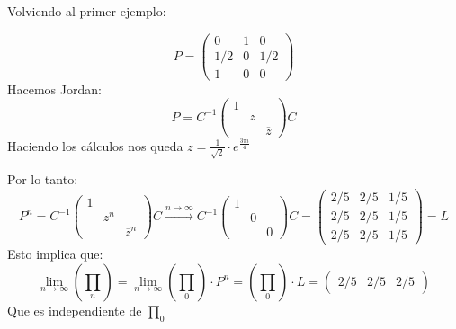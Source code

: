 Volviendo al primer ejemplo:
\begin{example}[1er caso]
$$P =\left(\begin{matrix}
0 & 1 & 0\\
1/2 & 0 & 1/2\\
1 & 0 & 0
\end{matrix}\right)$$
Hacemos Jordan:
$$P = C^{-1} \left(\begin{matrix}
	1&&\\
	&z&\\
	&&\overline{z}
	\end{matrix}\right) C$$
Haciendo los cálculos nos queda $z = \frac{1}{\sqrt{2}}\cdot e^{\frac{3\pi i}{4}}$

Por lo tanto:
$$P^n =  C^{-1} \left(\begin{matrix}
1&&\\
&z^n&\\
&&\overline{z}^n
\end{matrix}\right) C \stackrel{n\rightarrow \infty}{\rightarrow}  C^{-1} \left(\begin{matrix}
1&&\\
&0&\\
&&0
\end{matrix}\right) C = \left(\begin{matrix}
2/5&2/5&1/5\\
2/5&2/5&1/5\\
2/5&2/5&1/5
\end{matrix}\right) = L$$
Esto implica que:
$$\lim_{n\rightarrow\infty}(\prod_n) = \lim_{n\rightarrow\infty}(\prod_0)\cdot P^n = (\prod_0)\cdot L =( \begin{matrix}
2/5&2/5&2/5
\end{matrix})$$
Que es independiente de $\prod_0$
\end{example}

